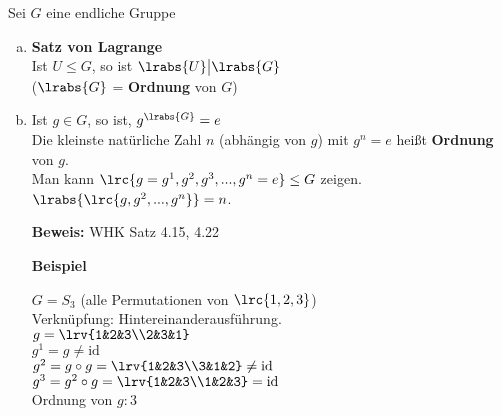 	Sei $G$ eine endliche Gruppe
	\begin{enumerate}[a)]
		\item \textbf{Satz von Lagrange}\\
		Ist $U\leq G$, so ist $\lrabs{U}\big|\lrabs{G}$\\
		($\lrabs{G}$ = \textbf{Ordnung} von $G$)

		\item Ist $g\in G$, so ist, $g^{\lrabs{G}}=e$\\
		Die kleinste natürliche Zahl $n$ (abhängig von $g$) mit $g^n=e$ heißt \textbf{Ordnung} von $g$.\\
		Man kann $\lrc{g=g^1,g^2,g^3,...,g^n=e}\leq G$ zeigen.\\
		$\lrabs{\lrc{g,g^2,...,g^n}}=n$.

		\textbf{Beweis:} WHK Satz 4.15, 4.22

		\textbf{Beispiel}

		$G=S_3$ (alle Permutationen von $\lrc{1,2,3}$)\\
		Verknüpfung: Hintereinanderausführung.\\
		$g=\lrv{1&2&3\\2&3&1}$ \\
		$g^1 = g \neq\mbox{id}$ \\
		$g^2 = g\circ g =\lrv{1&2&3\\3&1&2}\neq\mbox{id}$\\
		$g^3 = g^2\circ g =\lrv{1&2&3\\1&2&3}=\mbox{id}$\\
		Ordnung von $g: 3$
	\end{enumerate}
